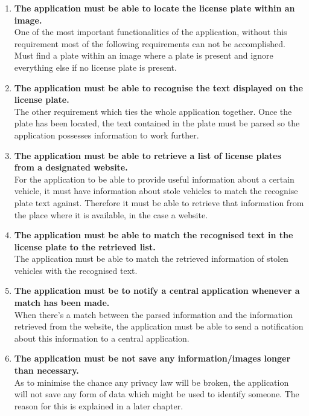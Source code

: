 \begin{enumerate}
    \item{\textbf{The application must be able to locate the license plate within an image.} \\
        One of the most important functionalities of the application, without this requirement most of the following requirements can not be accomplished. Must find a plate within an image where a plate is present and ignore everything else if no license plate is present.        
    }

    \item{\textbf{The application must be able to recognise the text displayed on the license plate.} \\
        The other requirement which ties the whole application together. Once the plate has been located, the text contained in the plate must be parsed so the application possesses information to work further. 
    }

    \item{\textbf{The application must be able to retrieve a list of license plates from a designated website.} \\
         For the application to be able to provide useful information about a certain vehicle, it must have information about stole vehicles to match the recognise plate text against. Therefore it must be able to retrieve that information from the place where it is available, in the case a website.
    }

    \item{\textbf{The application must be able to match the recognised text in the license plate to the retrieved list.} \\
        The application must be able to match the retrieved information of stolen vehicles with the recognised text.
    }

    \item{\textbf{The application must be to notify a central application whenever a match has been made.} \\
        When there's a match between the parsed information and the information retrieved from the website, the application must be able to send a notification about this information to a central application.
    }

    \item{\textbf{The application must be not save any information/images longer than necessary.} \\
        As to minimise the chance any privacy law will be broken, the application will not save any form of data which might be used to identify someone. The reason for this is explained in a later chapter.
    }

\end{enumerate}

